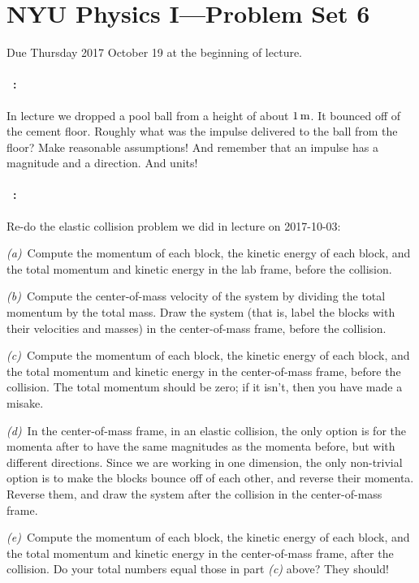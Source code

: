 \documentclass[12pt]{article}
\begin{document}
\section*{NYU Physics I---Problem Set 6}

Due Thursday 2017 October 19 at the beginning of lecture.

\paragraph{\problemname~\theproblem:}%
In lecture we dropped a pool ball from a height of about $1\,\mathrm{m}$. It
bounced off of the cement floor. Roughly what was the impulse
delivered to the ball from the floor? Make reasonable assumptions! And
remember that an impulse has a magnitude and a direction. And units!

\paragraph{\problemname~\theproblem:}\label{elastic}%
Re-do the elastic collision problem we did in lecture on 2017-10-03:

\textsl{(a)}~Compute the momentum of each block, the kinetic energy of
each block, and the total momentum and kinetic energy in the lab
frame, before the collision.

\textsl{(b)}~Compute the center-of-mass velocity of the system by
dividing the total momentum by the total mass. Draw the system (that
is, label the blocks with their velocities and masses) in the
center-of-mass frame, before the collision.

\textsl{(c)}~Compute the momentum of each block, the kinetic energy of
each block, and the total momentum and kinetic energy in the
center-of-mass frame, before the collision. The total momentum should
be zero; if it isn't, then you have made a misake.

\textsl{(d)}~In the center-of-mass frame, in an elastic collision, the
only option is for the momenta after to have the same magnitudes as
the momenta before, but with different directions. Since we are
working in one dimension, the only non-trivial option is to make the
blocks bounce off of each other, and reverse their momenta. Reverse
them, and draw the system after the collision in the center-of-mass
frame.

\textsl{(e)}~Compute the momentum of each block, the kinetic energy of
each block, and the total momentum and kinetic energy in the
center-of-mass frame, after the collision. Do your total numbers equal those
in part \textsl{(c)} above? They should!
\end{document}
